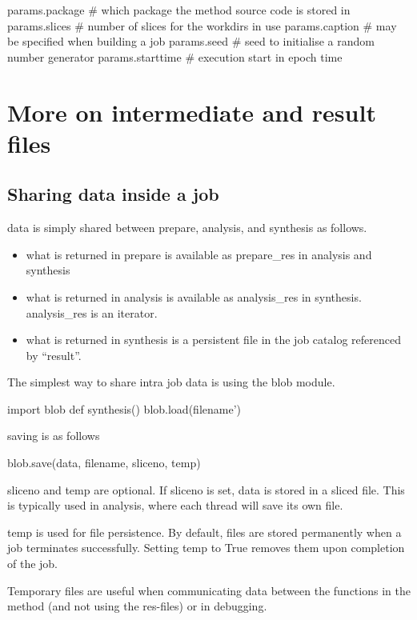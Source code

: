 \begin{python}
params.package     # which package the method source code is stored in
params.slices      # number of slices for the workdirs in use
params.caption     # may be specified when building a job
params.seed        # seed to initialise a random number generator
params.starttime   # execution start in epoch time
\end{python}



\newpage
\section{More on intermediate and result files}

\subsection{Sharing data inside a job}
data is simply shared between prepare, analysis, and synthesis as follows.
\begin{itemize}
\item what is returned in prepare is available as prepare\_res in analysis and synthesis
\item what is returned in analysis is available as analysis\_res in synthesis.  analysis\_res is an iterator.
\item what is returned in synthesis is a persistent file in the job catalog referenced by ``result''.
\end{itemize}

The simplest way to share intra job data is using the blob module.

\begin{python}
import blob
def synthesis()
  blob.load(filename')
\end{python}

saving is as follows

\begin{python}
  blob.save(data, filename, sliceno, temp)
\end{python}
sliceno and temp are optional.  If sliceno is set, data is stored in a
sliced file.  This is typically used in analysis, where each thread
will save its own file.

temp is used for file persistence.  By default, files are stored
permanently when a job terminates successfully.  Setting temp to True
removes them upon completion of the job.

Temporary files are useful when communicating data between the
functions in the method (and not using the res-files) or in debugging.


